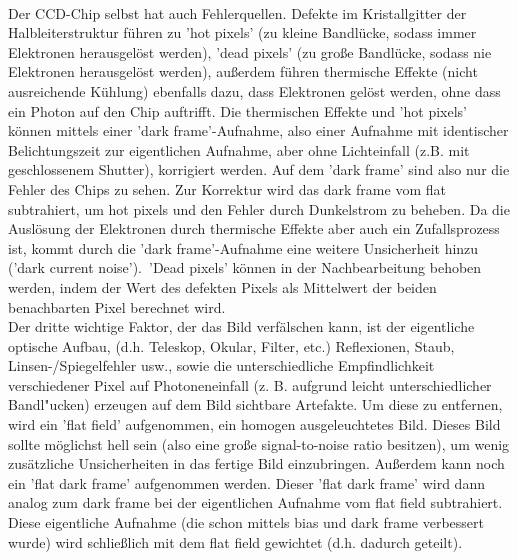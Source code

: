 \\
Der CCD-Chip selbst hat auch Fehlerquellen. Defekte im Kristallgitter der Halbleiterstruktur führen zu 'hot pixels' (zu kleine Bandlücke, sodass immer Elektronen herausgelöst werden), 'dead pixels' (zu große Bandlücke, sodass nie Elektronen herausgelöst werden), außerdem führen thermische Effekte (nicht ausreichende Kühlung) ebenfalls dazu, dass Elektronen gelöst werden, ohne dass ein Photon auf den Chip auftrifft. Die thermischen Effekte und 'hot pixels' können mittels einer 'dark frame'-Aufnahme, also einer Aufnahme mit identischer Belichtungszeit zur eigentlichen Aufnahme, aber ohne Lichteinfall (z.B. mit geschlossenem Shutter), korrigiert werden. Auf dem 'dark frame' sind also nur die Fehler des Chips zu sehen. Zur Korrektur wird das dark frame vom flat subtrahiert, um hot pixels und den Fehler durch Dunkelstrom zu beheben. Da die Auslösung der Elektronen durch thermische Effekte aber auch ein Zufallsprozess ist, kommt durch die 'dark frame'-Aufnahme eine weitere Unsicherheit hinzu ('dark current noise').\
'Dead pixels' können in der Nachbearbeitung behoben werden, indem der Wert des defekten Pixels als Mittelwert der beiden benachbarten Pixel berechnet wird.
\\
Der dritte wichtige Faktor, der das Bild verfälschen kann, ist der eigentliche optische Aufbau, (d.h. Teleskop, Okular, Filter, etc.) Reflexionen, Staub, Linsen-/Spiegelfehler usw., sowie die unterschiedliche Empfindlichkeit verschiedener Pixel auf Photoneneinfall (z. B. aufgrund leicht unterschiedlicher Bandl"ucken) erzeugen auf dem Bild sichtbare Artefakte. Um diese zu entfernen, wird ein 'flat field' aufgenommen, ein homogen ausgeleuchtetes Bild. Dieses Bild sollte möglichst hell sein (also eine große signal-to-noise ratio besitzen), um wenig zusätzliche Unsicherheiten in das fertige Bild einzubringen. Außerdem kann noch ein 'flat dark frame' aufgenommen werden. Dieser  'flat dark frame' wird dann analog zum dark frame bei der eigentlichen Aufnahme vom flat field subtrahiert. Diese eigentliche Aufnahme (die schon mittels bias und dark frame verbessert wurde) wird schließlich mit dem flat field gewichtet (d.h. dadurch geteilt).



